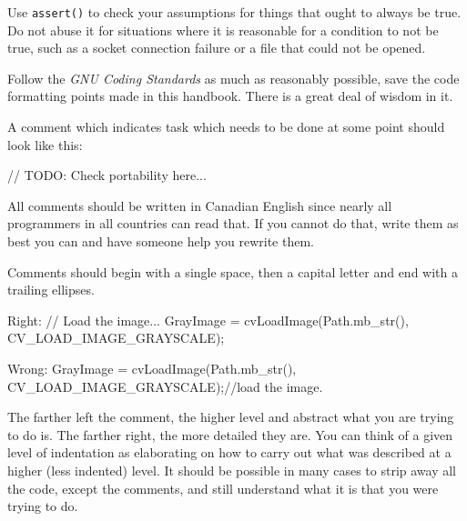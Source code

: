 \item
Use {\tt assert()} to check your assumptions for things that ought to always be true. Do not abuse it for situations where it is reasonable for a condition to not be true, such as a socket connection failure or a file that could not be opened.

\item
Follow the {\it GNU Coding Standards} as much as reasonably possible, save the code formatting points made in this handbook. There is a great deal of wisdom in it.

\item
A comment which indicates task which needs to be done at some point should look like this: 

\startCodeExample
\starttyping
// TODO: Check portability here...
\stoptyping
\stopCodeExample

\stopitemize


\startitemize[3]
\setupwhitespace[big]
\item
All comments should be written in Canadian English since nearly all programmers in all countries can read that. If you cannot do that, write them as best you can and have someone help you rewrite them.

\item
Comments should begin with a single space, then a capital letter and end with a trailing ellipses. 

Right:
\startCodeExample
\starttyping
// Load the image...
GrayImage = cvLoadImage(Path.mb_str(), CV_LOAD_IMAGE_GRAYSCALE);
\stoptyping
\stopCodeExample

Wrong:
\startCodeExample
\starttyping
GrayImage = cvLoadImage(Path.mb_str(), CV_LOAD_IMAGE_GRAYSCALE);//load the image.
\stoptyping
\stopCodeExample

\item
The farther left the comment, the higher level and abstract what you are trying to do is. The farther right, the more detailed they are. You can think of a given level of indentation as elaborating on how to carry out what was described at a higher (less indented) level. It should be possible in many cases to strip away all the code, except the comments, and still understand what it is that you were trying to do.

